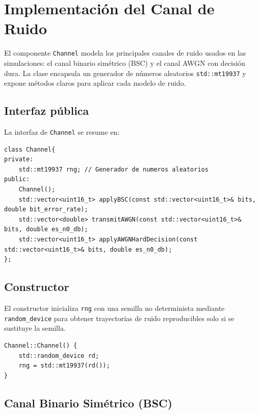 \section{Implementación del Canal de Ruido}
\label{sec:channel}

El componente \texttt{Channel} modela los principales canales de ruido usados en las simulaciones: el canal binario simétrico (BSC) y el canal AWGN con decisión dura. La clase encapsula un generador de números aleatorios \texttt{std::mt19937} y expone métodos claros para aplicar cada modelo de ruido.

\subsection{Interfaz pública}

La interfaz de \texttt{Channel} se resume en:

\begin{lstlisting}[style=CodigoCPP, caption={Definición de la clase \texttt{Channel}, encapsulando el generador de números aleatorios para la inyección de ruido.}, label={lst:channel_class}]
class Channel{
private:
    std::mt19937 rng; // Generador de numeros aleatorios
public:
    Channel();
    std::vector<uint16_t> applyBSC(const std::vector<uint16_t>& bits, double bit_error_rate);
    std::vector<double> transmitAWGN(const std::vector<uint16_t>& bits, double es_n0_db);
    std::vector<uint16_t> applyAWGNHardDecision(const std::vector<uint16_t>& bits, double es_n0_db);
};
\end{lstlisting}

\subsection{Constructor}

El constructor inicializa \texttt{rng} con una semilla no determinista mediante \texttt{random\_device} para obtener trayectorias de ruido reproducibles solo si se sustituye la semilla.

\begin{lstlisting}[style=CodigoCPP, caption={Inicialización del generador de entropía \texttt{mt19937} empleando una semilla de \texttt{std::random\_device} en el constructor de \texttt{Channel}.}, label={lst:channel_constructor}]
Channel::Channel() {
    std::random_device rd;
    rng = std::mt19937(rd());
}
\end{lstlisting}

\subsection{Canal Binario Simétrico (BSC)}

